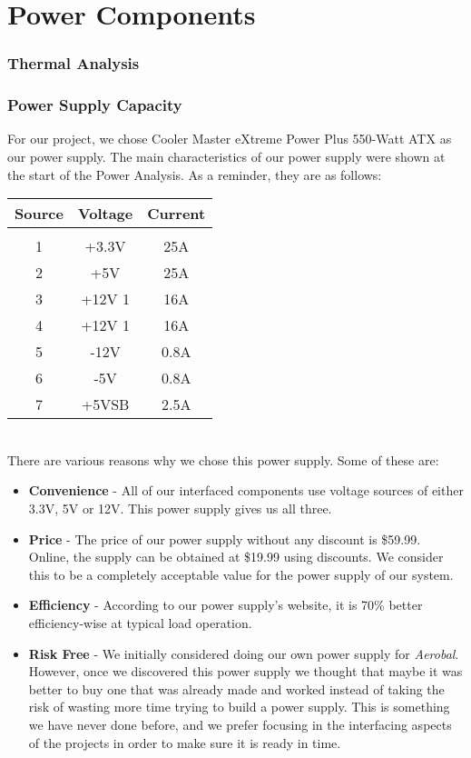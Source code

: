 \documentclass[11pt]{article}
\begin{document}
\part{Power Components}


\section{Thermal Analysis}


\section{Power Supply Capacity}

For our project, we chose Cooler Master eXtreme Power Plus 550-Watt ATX as our power supply. The main characteristics of our power supply were shown at the start of the Power Analysis. As a reminder, they are as follows: 

\begin{tabular}{|c|c|c|}
\hline
Source & Voltage & Current  \\
\hline
& & \\
1 & +3.3V & 25A  \\
2 & +5V & 25A  \\
3 & +12V 1 & 16A  \\
4 & +12V 1 & 16A  \\
5 & -12V & 0.8A  \\
6 & -5V & 0.8A  \\
7 & +5VSB & 2.5A  \\
\hline
\end{tabular} \\

There are various reasons why we chose this power supply. Some of these are: 

\begin{itemize}
  \item \textbf{Convenience} - All of our interfaced components use voltage sources of either 3.3V, 5V or 12V. This power supply gives us all three. 
  \item \textbf{Price} - The price of our power supply without any discount is \$59.99. Online, the supply can be obtained at \$19.99 using discounts. We consider this to be a completely acceptable value for the power supply of our system. 
  \item \textbf{Efficiency} - According to our power supply's website, it is 70\% better efficiency-wise at typical load operation.
  \item \textbf{Risk Free} - We initially considered doing our own power supply for \textit{Aerobal}. However, once we discovered this power supply we thought that maybe it was better to buy one that was already made and worked instead of taking the risk of wasting more time trying to build a power supply. This is something we have never done before, and we prefer focusing in the interfacing aspects of the projects in order to make sure it is ready in time.

\end{itemize} 
\end{document}
